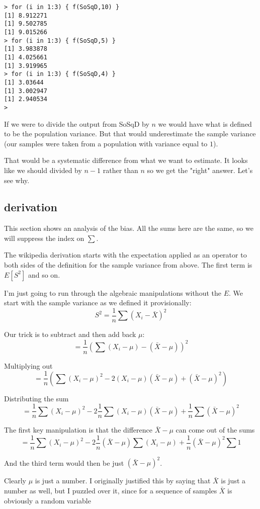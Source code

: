 \documentclass[11pt, oneside]{article}
\begin{document}
\begin{verbatim}
> for (i in 1:3) { f(SoSqD,10) }
[1] 8.912271
[1] 9.502785
[1] 9.015266
> for (i in 1:3) { f(SoSqD,5) }
[1] 3.983878
[1] 4.025661
[1] 3.919965
> for (i in 1:3) { f(SoSqD,4) }
[1] 3.03644
[1] 3.002947
[1] 2.940534
> 
\end{verbatim}

If we were to divide the output from SoSqD by $n$ we would have what is defined to be the population variance.  But that would underestimate the sample variance (our samples were taken from a population with variance equal to $1$). 

That would be a systematic difference from what we want to estimate.  It looks like we should divided by $n-1$ rather than $n$ so we get the "right" answer.  Let's see why.

\subsection*{derivation}

This section shows an analysis of the bias.  All the sums here are the same, so we will suppress the index on $\sum$.

The wikipedia derivation starts with the expectation applied as an operator to both sides of the definition for the sample variance from above.  The first term is $E[S^2]$ and so on.

I'm just going to run through the algebraic manipulations without the $E$.  We start with the sample variance as we defined it provisionally:
\[ S^2 = \frac{1}{n} \sum (X_i - \bar{X})^2 \]

Our trick is to subtract and then add back $\mu$:
\[ = \frac{1}{n} (\sum (X_i - \mu) - (\bar{X} - \mu))^2 \]

Multiplying out
\[ = \frac{1}{n} ( \sum (X_i - \mu)^2 - 2(X_i - \mu)(\bar{X} - \mu) + (\bar{X} - \mu)^2 ) \]

Distributing the sum
\[ = \frac{1}{n} \sum (X_i - \mu)^2 - 2 \frac{1}{n} \sum (X_i - \mu)(\bar{X} - \mu) + \frac{1}{n} \sum (\bar{X} - \mu)^2 \]

The first key manipulation is that the difference $\bar{X} - \mu$ can come out of the sums
\[ = \frac{1}{n} \sum (X_i - \mu)^2 - 2 \frac{1}{n}  (\bar{X} - \mu) \sum(X_i - \mu) + \frac{1}{n} (\bar{X} - \mu)^2 \sum 1 \]

And the third term would then be just $(\bar{X} - \mu)^2$.

Clearly $\mu$ is just a number.  I originally justified this by saying that $\bar{X}$ is just a number as well, but I puzzled over it, since for a sequence of samples $\bar{X}$ is obviously a random variable
\end{document}
